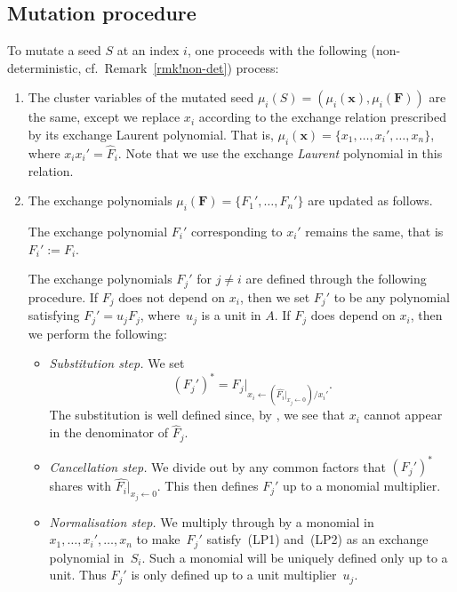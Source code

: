 \documentclass[10pt,a4paper]{amsart}
\numberwithin{equation}{section}
\theoremstyle{definition}
\begin{document}
\subsection{Mutation procedure}
To mutate a seed $S$ at an index $i$, one proceeds with the following (non-deterministic, cf.\ Remark~\ref{rmk!non-det}) process:
\begin{enumerate}\itemsep=0pt
 \item[(1)] The cluster variables of the mutated seed $\mu_i(S) = ( \mu_i(\bm{x}), \mu_i(\bm{F}) )$ are the same, except we replace $x_i$ according to the exchange relation prescribed by its exchange Laurent polynomial. That is, $\mu_i(\bm{x}) = \{x_1, \dots, x_i', \dots, x_n\}$, where $x_i x_i' = \hat{F}_i$.
 Note that we use the exchange \textit{Laurent} polynomial in this relation.
 \item[(2)] The exchange polynomials $\mu_i(\bm{F}) = \{F_1',\ldots,F_n'\}$ are updated as follows.

 The exchange polynomial $F_{i}'$ corresponding to $x_i'$ remains the same, that is $F_i' := F_i$.

 The exchange polynomials $F_j '$ for $j \neq i$ are defined through the following procedure. If $F_j$ does not depend on $x_i$, then we set $F_j '$ to be any polynomial satisfying $F_j ' = u_j F_j$, where~$u_j$ is a unit in $A$. If $F_j$ does depend on $x_i$, then we perform the following:
 \begin{itemize}\itemsep=0pt
 \item \textit{Substitution step.} We set
 \begin{equation*}
 ( F_j ' )^* = F_j |_{x_i \leftarrow (\hat{F_i} |_{x_{j} \leftarrow 0}) / x_i'}.
 			\end{equation*}
 The substitution is well defined since, by \cite[Lemma~2.7]{lp}, %
 we see that $x_i$ cannot appear in the denominator of $\hat{F}_{j}$.
 \item \textit{Cancellation step.} We divide out by any common factors that $(F_j ')^*$ shares with $\hat{F_i}|_{x_j \leftarrow 0}$. This then defines $F_j '$ up to a monomial multiplier.
 \item \textit{Normalisation step.} We multiply through by a monomial in $x_1, \dots, x_i', \dots, x_n$ to make~$F_j '$ satisfy~(LP1) and~(LP2) as an exchange polynomial in~$S_i$. Such a monomial will be uniquely defined only up to a unit. Thus $F_j '$ is only defined up to a unit multiplier~$u_j$.
 \end{itemize}
 \end{enumerate}
\end{document}
